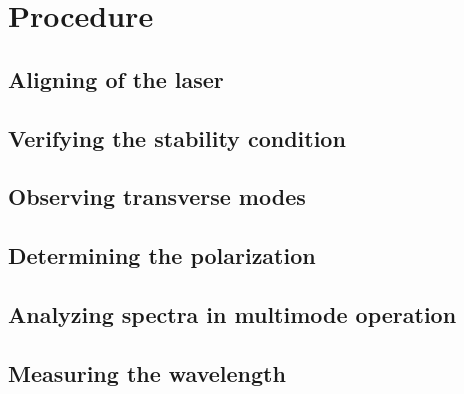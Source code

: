 \section{Procedure}

\subsection{Aligning of the laser}

\subsection{Verifying the stability condition}

\subsection{Observing transverse modes}

\subsection{Determining the polarization}

\subsection{Analyzing spectra in multimode operation}

\subsection{Measuring the wavelength}
